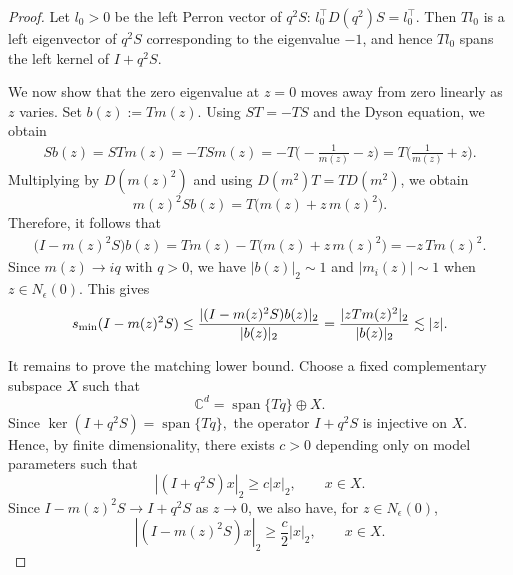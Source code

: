 \documentclass[11pt,twoside, a4paper]{article}
\numberwithin{equation}{section}
\numberwithin{figure}{section}
\theoremstyle{plain} %
\theoremstyle{definition}
\theoremstyle{remark}
\newcommand{\1} {\mspace{1 mu}}
\newcommand{\2} {\mspace{2 mu}}
\begin{document}
\begin{proof}
    Let \(l_0>0\) be the left Perron vector of \(q^2S\):
    $
        l_0^\top D(q^2)S=l_0^\top .
    $
    Then \(Tl_0\) is a left eigenvector of \(q^2S\) corresponding to the
    eigenvalue \(-1\), and hence \(Tl_0\) spans the left kernel of
    \(I+q^2S\).

    We now show that the zero eigenvalue at \(z=0\) moves away from zero linearly as \(z\) varies.
    Set
    $
        b(z):=T m(z).
    $
    Using \(ST=-TS\) and the Dyson equation, we obtain 
    \[
    \begin{aligned}
        S b(z)
        =
        STm(z)
        =
        -TSm(z)                                                     
        =
        -T\Big(-\frac1{m(z)}-z\Big)
        =
        T\Big(\frac1{m(z)}+z\Big).
    \end{aligned}
    \]
    Multiplying by \(D(m(z)^2)\) and using $D(m^2)T=TD(m^2)$, we obtain
    \[
        m(z)^2 S b(z)
        =
        T\big(m(z)+z\,m(z)^2\big).
    \]
    Therefore, it follows that
    \begin{equation}\label{eq.bad-vector-linear-opening}
    \begin{aligned}
        \big(I-m(z)^2S\big)b(z)
        =
        Tm(z)-T\big(m(z)+z\,m(z)^2\big) 
        =
        -z\,T m(z)^2 .
    \end{aligned}
    \end{equation}
    Since \(m(z)\to iq\) with \(q>0\), we have \(|b(z)|_2\sim 1\) and \(|m_i(z)|\sim1\) when $z\in N_\epsilon(0)$. This gives 
    \[
      s_{\rm min}(I-m(z)^2S)
      \le
      \frac{|(I-m(z)^2S)b(z)|_2}{|b(z)|_2}
      =\frac{|zTm(z)^2|_2}{|b(z)|_2}
      \lesssim |z|.
    \]


    It remains to prove the matching lower bound. Choose a fixed complementary
    subspace \(X\) such that
    \begin{equation}\label{eq.Cd-decomposition1}
      \mathbb C^d=\operatorname{span}\{Tq\}\oplus X .
    \end{equation}
    Since
    $
        \ker(I+q^2S)=\operatorname{span}\{Tq\},
    $
    the operator \(I+q^2S\) is injective on \(X\). Hence, by finite
    dimensionality, there exists \(c>0\) depending only on model parameters such that
    \[
        |(I+q^2S)x|_2\ge c|x|_2,
        \qquad x\in X .
    \]
    Since \(I-m(z)^2S\to I+q^2S\) as \(z\to0\), we also have, for \(z\in N_\epsilon(0)\),
    \begin{equation}\label{eq.perturbed-lower-bound}
        |(I-m(z)^2S)x|_2\ge \frac c2|x|_2,\qquad x\in X .
    \end{equation}
        


\end{proof}
\end{document}
